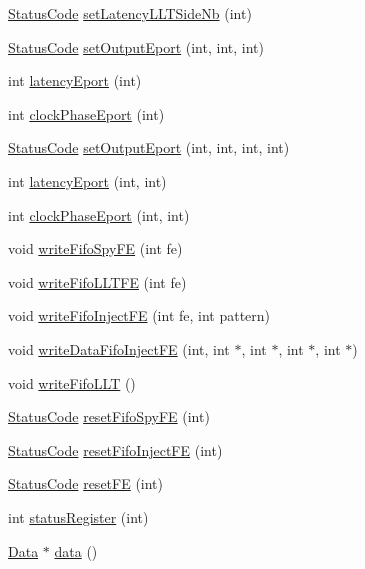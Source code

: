 \begin{DoxyCompactItemize}
\hyperlink{classStatusCode}{Status\+Code} \hyperlink{classFEB__v1_a840532b78d0062646116a076e65cf353}{set\+Latency\+L\+L\+T\+Side\+Nb} (int)
\item 
\hyperlink{classStatusCode}{Status\+Code} \hyperlink{classFEB__v1_ae94205e374c3438e910aa39a889ebf5c}{set\+Output\+Eport} (int, int, int)
\item 
int \hyperlink{classFEB__v1_a330c0a895c3c43acda2fd68e1cdb7368}{latency\+Eport} (int)
\item 
int \hyperlink{classFEB__v1_a4a5b20275b96a19eba0c28d694c88ca8}{clock\+Phase\+Eport} (int)
\item 
\hyperlink{classStatusCode}{Status\+Code} \hyperlink{classFEB__v1_ae8ed47630ca1408647e3eb5c1dfa0ec0}{set\+Output\+Eport} (int, int, int, int)
\item 
int \hyperlink{classFEB__v1_a8ab1ff429d357779d682bdf28504bdd2}{latency\+Eport} (int, int)
\item 
int \hyperlink{classFEB__v1_aab32d0b274dfb55f1c2894ff3d08eaba}{clock\+Phase\+Eport} (int, int)
\item 
void \hyperlink{classFEB__v1_a0fd77cbaae9ae853e5c4dfc81b4462a5}{write\+Fifo\+Spy\+FE} (int fe)
\item 
void \hyperlink{classFEB__v1_a9dbedaebc2e3569e8b5fc0be782dbce3}{write\+Fifo\+L\+L\+T\+FE} (int fe)
\item 
void \hyperlink{classFEB__v1_ae212b0e4c9824afaebb4508b688f94bf}{write\+Fifo\+Inject\+FE} (int fe, int pattern)
\item 
void \hyperlink{classFEB__v1_a0afafcfdea15d3268284203a90c67572}{write\+Data\+Fifo\+Inject\+FE} (int, int $\ast$, int $\ast$, int $\ast$, int $\ast$)
\item 
void \hyperlink{classFEB__v1_a0e88b14453100c97b5962e8a6b0f48bf}{write\+Fifo\+L\+LT} ()
\item 
\hyperlink{classStatusCode}{Status\+Code} \hyperlink{classFEB__v1_ab02c292e29e01079bb9b268acbc782b1}{reset\+Fifo\+Spy\+FE} (int)
\item 
\hyperlink{classStatusCode}{Status\+Code} \hyperlink{classFEB__v1_a71d10a772bda2506fd7adb86739fb24d}{reset\+Fifo\+Inject\+FE} (int)
\item 
\hyperlink{classStatusCode}{Status\+Code} \hyperlink{classFEB__v1_ae351e55f3d8e8f936c324ffbda6816bf}{reset\+FE} (int)
\item 
int \hyperlink{classFEB__v1_aa98b8e0bcc4d6d03f4b365de786f5c95}{status\+Register} (int)
\item 
\hyperlink{classData}{Data} $\ast$ \hyperlink{classFEB__v1_a6bca4320bd3bbbc32efc81097f33421a}{data} ()

\end{DoxyCompactItemize}
